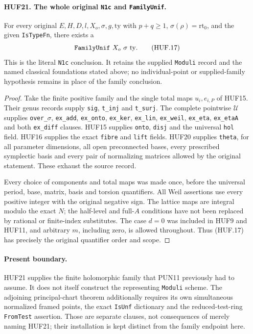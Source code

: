 \documentclass[11pt,a4paper]{article}
\numberwithin{equation}{section}
\theoremstyle{remark}\newtheorem{remark}[theorem]{Remark}
\begin{document}
\paragraph{HUF21. The whole original \texttt{N1c} and \texttt{Family\allowbreak Unif}.}
\label{claim:HUF21}
For every original \(E,H,D,l,X_o,\sigma,g,\mathrm{ty}\)
with \(p+q\geq1\), \(\sigma(\rho)=\mathrm{rt}_0\),
and the given \texttt{Is\allowbreak Type\allowbreak Fn}, there exists a
\[
                       \texttt{Family\allowbreak Unif}\ X_o\ \sigma\ \mathrm{ty}.
 \tag{HUF.17}
\]
This is the literal \texttt{N1c} conclusion.
It retains the supplied \texttt{Moduli} record
and the named classical foundations stated above;
no individual-point or supplied-family hypothesis
remains in place of the family conclusion.

\begin{proof}
Take the finite positive family and the single
total maps \(u_i,e_{i,P}\) of HUF15.
Their genus records supply \texttt{sig},
\texttt{t\_\allowbreak inj} and \texttt{t\_\allowbreak surj}.
The complete pointwise \(\mathcal U\) supplies
\texttt{over\_\allowbreak \(\sigma\)}, \texttt{ex\_\allowbreak add},
\texttt{ex\_\allowbreak onto}, \texttt{ex\_\allowbreak ker},
\texttt{ex\_\allowbreak lin}, \texttt{ex\_\allowbreak weil},
\texttt{ex\_\allowbreak eta}, \texttt{ex\_\allowbreak eta\allowbreak A}
and both \texttt{ex\_\allowbreak diff} clauses.
HUF15 supplies \texttt{onto}, \texttt{disj}
and the universal \texttt{hol} field.
HUF16 supplies the exact \texttt{fibre}
and \texttt{lift} fields.
HUF20 supplies \texttt{theta}, for all
parameter dimensions, all open preconnected
bases, every prescribed symplectic basis
and every pair of normalizing matrices
allowed by the original statement.
These exhaust the source record.

Every choice of components and total maps
was made once, before the universal
period, base, matrix, basis and torsion
quantifiers.  All Weil assertions use
every positive integer with the original
negative sign.  The lattice maps are
integral modulo the exact \(N\);
the half-level and full-\(A\) conditions
have not been replaced by rational
or finite-index substitutes.
The case \(d=0\) was included in HUF9
and HUF11, and arbitrary \(m\), including
zero, is allowed throughout.
Thus (HUF.17) has precisely the original
quantifier order and scope.
\end{proof}

\paragraph{Present boundary.}
HUF21 supplies the finite holomorphic family
that PUN11 previously had to assume.
It does not itself construct the representing
\texttt{Moduli} scheme.
The adjoining principal-chart theorem additionally
requires its own simultaneous normalized framed
points, the exact \texttt{Is\allowbreak Unf} dictionary and
the reduced-test-ring \texttt{From\allowbreak Test} assertion.
Those are separate clauses, not consequences
of merely naming HUF21; their installation is
kept distinct from the family endpoint here.
\end{document}
